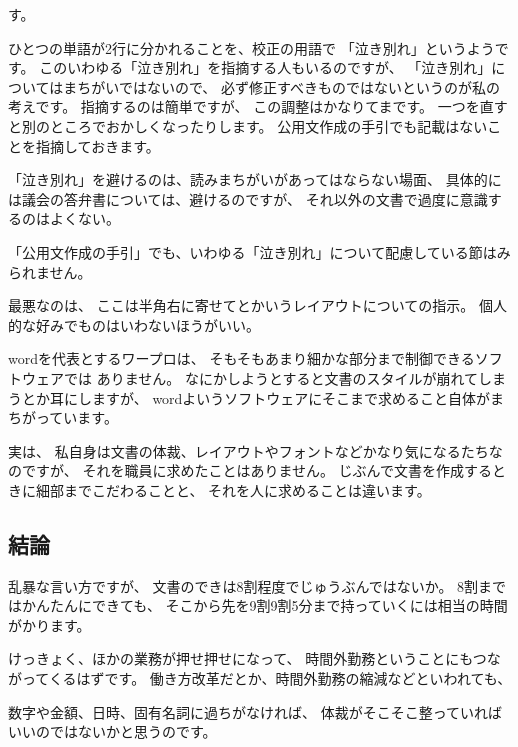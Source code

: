 \documentclass[uplatex,jis2004,dvipdfmx,12pt]{jsarticle}
\begin{document}


す。


ひとつの単語が2行に分かれることを、校正の用語で
「泣き別れ」というようです。
このいわゆる「泣き別れ」を指摘する人もいるのですが、
「泣き別れ」についてはまちがいではないので、
必ず修正すべきものではないというのが私の考えです。
指摘するのは簡単ですが、
この調整はかなりてまです。
一つを直すと別のところでおかしくなったりします。
公用文作成の手引でも記載はないことを指摘しておきます。

「泣き別れ」を避けるのは、読みまちがいがあってはならない場面、
具体的には議会の答弁書については、避けるのですが、
それ以外の文書で過度に意識するのはよくない。

「公用文作成の手引」でも、いわゆる「泣き別れ」について配慮している節はみ
られません。

最悪なのは、
ここは半角右に寄せてとかいうレイアウトについての指示。
個人的な好みでものはいわないほうがいい。


wordを代表とするワープロは、
そもそもあまり細かな部分まで制御できるソフトウェアでは
ありません。
なにかしようとすると文書のスタイルが崩れてしまうとか耳にしますが、
wordよいうソフトウェアにそこまで求めること自体がまちがっています。


実は、
私自身は文書の体裁、レイアウトやフォントなどかなり気になるたちなのですが、
それを職員に求めたことはありません。
じぶんで文書を作成するときに細部までこだわることと、
それを人に求めることは違います。




\subsection{結論}
乱暴な言い方ですが、
文書のできは8割程度でじゅうぶんではないか。
8割まではかんたんにできても、
そこから先を9割9割5分まで持っていくには相当の時間がかります。

けっきょく、ほかの業務が押せ押せになって、
時間外勤務ということにもつながってくるはずです。
働き方改革だとか、時間外勤務の縮減などといわれても、


数字や金額、日時、固有名詞に過ちがなければ、
体裁がそこそこ整っていればいいのではないかと思うのです。
\end{document}
